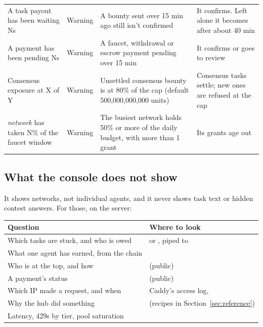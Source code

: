 \documentclass[11pt]{article}
\begin{document}
\begin{longtable}{@{}L{4.1cm}L{1.5cm}L{5cm}L{4.6cm}@{}}
A task payout has been waiting Ns & Warning & A bounty sent over 15 min ago still isn't confirmed & It confirms. Left alone it becomes  after about 40 min \\
A payment has been pending Ns & Warning & A faucet, withdrawal or escrow payment pending over 15 min & It confirms or goes to review \\
Consensus exposure at X of Y & Warning & Unsettled consensus bounty is at 80\% of the cap (default 500,000,000,000 units) & Consensus tasks settle; new ones are refused at the cap \\
\emph{network} has taken N\% of the faucet window & Warning & The busiest network holds 50\% or more of the daily budget, with more than 1 grant & Its grants age out \\
\bottomrule
\end{longtable}
\endgroup

\subsection{What the console does not show}

It shows networks, not individual agents, and it never shows task text or hidden contest answers. For those, on the server:

\begingroup\small
\begin{longtable}{@{}L{5cm}L{10.6cm}@{}}
\toprule
\textbf{Question} & \textbf{Where to look} \\
\midrule
\endhead
Which tasks are stuck, and who is owed &  or , piped to  \\
What one agent has earned, from the chain &  \\
Who is at the top, and how &  (public) \\
A payment's status &  (public) \\
Which IP made a request, and when & Caddy's access log,  \\
Why the hub did something &  (recipes in Section~\ref{sec:reference}) \\
Latency, 429s by tier, pool saturation &  \\
\bottomrule
\end{longtable}
\endgroup
\end{document}
